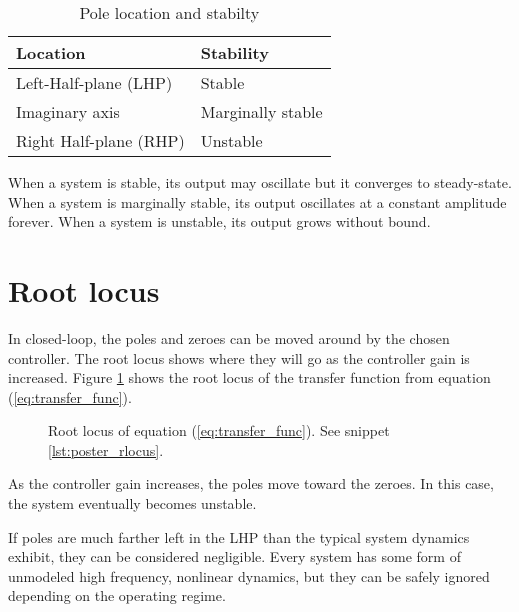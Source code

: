 \begin{table}
  \renewcommand{\arraystretch}{1.5}
  \centering
  \begin{tabular}{|ll|}
    \hline
    \rowcolor{headingbg}
    \textbf{Location} & \textbf{Stability} \\
    \hline
    Left-Half-plane (LHP) & Stable \\
    Imaginary axis & Marginally stable \\
    Right Half-plane (RHP) & Unstable \\
    \hline
  \end{tabular}
  \caption{Pole location and stabilty}
  \label{tab:pole_locations}
\end{table}

When a system is stable, its output may oscillate but it converges to
steady-state. When a system is marginally stable, its output oscillates at a
constant amplitude forever. When a system is unstable, its output grows without
bound.

\section{Root locus}

In closed-loop, the poles and zeroes can be moved around by the chosen
controller. The root locus shows where they will go as the controller gain is
increased. Figure \ref{fig:poster_rlocus} shows the root locus of the transfer
function from equation (\ref{eq:transfer_func}).

\begin{figure}[H]
  \def\svgwidth{\linewidth}
  
  \caption{Root locus of equation (\ref{eq:transfer_func}). See snippet
    \ref{lst:poster_rlocus}.}
  \label{fig:poster_rlocus}
\end{figure}

\begin{snippet}
  \caption{Root locus in Python}
  \label{lst:poster_rlocus}
\end{snippet}

As the controller gain increases, the poles move toward the zeroes. In this
case, the \gls{system} eventually becomes unstable.

\begin{remark}
  If poles are much farther left in the LHP than the typical \gls{system}
  dynamics exhibit, they can be considered negligible. Every \gls{system} has
  some form of unmodeled high frequency, nonlinear dynamics, but they can be
  safely ignored depending on the operating regime.
\end{remark}

